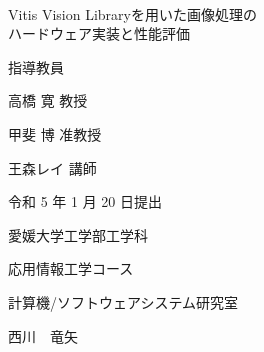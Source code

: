 \documentclass[11pt,a4j]{jreport}
\begin{document}
\thispagestyle{empty}
\begin{center}
\
\vspace{3cm}

{\huge{Vitis Vision Libraryを用いた画像処理の\\
ハードウェア実装と性能評価}}

\vspace{9mm}

{\LARGE 指導教員}

\vspace{5mm}

{\LARGE 高橋 寛 教授}

\vspace{4mm}

{\LARGE 甲斐 博 准教授}

\vspace{4mm}

{\LARGE 王森レイ 講師}

\vspace{20mm}

{\LARGE 令和 5 年 1 月 20 日提出}\\

\vspace{20mm}

{\LARGE 愛媛大学工学部工学科}\\

\vspace{4mm}

{\LARGE 応用情報工学コース}\\

\vspace{4mm}

{\LARGE 計算機/ソフトウェアシステム研究室}\\

\vspace{18mm}

{\huge 西川　竜矢}\\

\end{center}

\thispagestyle{empty}
\clearpage

\tableofcontents

\pagestyle{fancy}
\lhead{\rightmark}
\renewcommand{\chaptermark}[1]{\markboth{第\ \normalfont\thechapter\ 章~~#1}{}}
%
\end{document}
